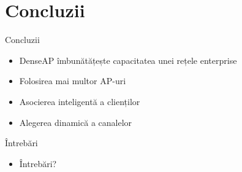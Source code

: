 \section{Concluzii}

\begin{frame}{Concluzii}
  \begin{itemize}
    \item DenseAP îmbunătățește capacitatea unei rețele enterprise
    \item Folosirea mai multor AP-uri
    \item Asocierea inteligentă a clienților
    \item Alegerea dinamică a canalelor
  \end{itemize}
\end{frame}

\begin{frame}{Întrebări}
  \begin{itemize}
    \item Întrebări?
  \end{itemize}
\end{frame}

